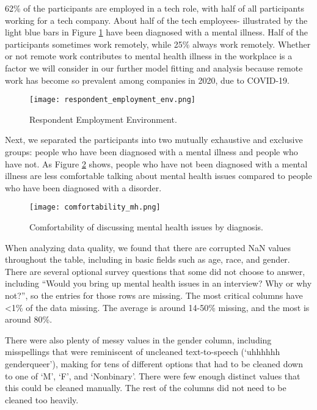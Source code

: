 \documentclass[times, twocolumn]{article}
\begin{document}
62\% of the participants are employed in a tech role, with half of all 
participants working for a tech company. About half of the tech employees-
illustrated by the light blue bars in Figure \ref{fig:respondent} have been 
diagnosed with a mental illness. Half of the participants sometimes work 
remotely, while 25\% always work remotely. Whether or not remote work contributes 
to mental health illness in the workplace is a factor we will consider in our 
further model fitting and analysis because remote work has become so prevalent 
among companies in 2020, due to COVID-19. 

\begin{figure}
    \centering
    \texttt{[image: respondent\_employment\_env.png]}
    \caption{Respondent Employment Environment.}
    \label{fig:respondent}
\end{figure}

Next, we separated the participants into two mutually exhaustive and exclusive 
groups: people who have been diagnosed with a mental illness and people who have 
not. As Figure \ref{fig:comfortability_mh} shows, people who have not been 
diagnosed with a mental illness are less comfortable talking about mental 
health issues compared to people who have been diagnosed with a disorder.  

\begin{figure}
    \centering
    \texttt{[image: comfortability\_mh.png]}
    \caption{Comfortability of discussing mental health issues by diagnosis.}
    \label{fig:comfortability_mh}
\end{figure}

When analyzing data quality, we found that there are corrupted NaN values 
throughout the table, including in basic fields such as age, race, and gender. 
There are several optional survey questions that some did not choose to answer, 
including “Would you bring up mental health issues in an interview? Why or why not?”, 
so the entries for those rows are missing. The most critical columns have <1\% 
of the data missing. The average is around 14-50\% missing, and the most is 
around 80\%. 

There were also plenty of messy values in the gender column, including misspellings 
that were reminiscent of uncleaned text-to-speech (‘uhhhhhh genderqueer’), making 
for tens of different options that had to be cleaned down to one of ‘M’, ‘F’, and 
‘Nonbinary’. There were few enough distinct values that this could be cleaned manually. 
The rest of the columns did not need to be cleaned too heavily. 
\end{document}
